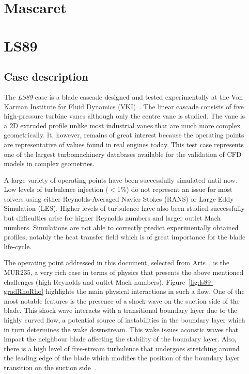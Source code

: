 \chapter{Mascaret}


\chapter{LS89}\label{chap:ls89}

\section{Case description} 
The \textit{LS89} case is a blade cascade designed and tested experimentally at the Von Karman Institute for Fluid Dynamics (VKI)~\cite{arts1990}. The linear cascade consists of five high-pressure turbine vanes although only the centre vane is studied. The vane is a 2D extruded profile unlike most industrial vanes that are much more complex geometrically. It, however, remains of great interest because the operating points are representative of values found in real engines today. This test case represents one of the largest turbomachinery databases available for the validation of CFD models in complex geometries.

A large variety of operating points have been successfully simulated until now. Low levels of turbulence injection ($<1$\%) do not represent an issue for most solvers \cite{Gourdain2010,emory2016} using either Reynolds-Averaged Navier Stokes (RANS) or Large Eddy Simulation (LES). Higher levels of turbulence have also been studied successfully~\cite{Wheeler2015} but difficulties arise for higher Reynolds numbers and larger outlet Mach numbers. Simulations are not able to correctly predict experimentally obtained profiles, notably the heat transfer field which is of great importance for the blade life-cycle.

The operating point addressed in this document, selected from Arts~\cite{arts1990}, is the MUR235, a very rich case in terms of physics that presents the above mentioned challenges (high Reynolds and outlet Mach numbers). Figure~\ref{fig:ls89-gradRhoRho} highlights the main physical interactions in such a flow. One of the most notable features is the presence of a shock wave on the suction side of the blade. This shock wave interacts with a transitional boundary layer due to the highly curved flow, a potential source of instabilities in the boundary layer which in turn determines the wake downstream. This wake issues acoustic waves that impact the neighbour blade affecting the stability of the boundary layer. Also, there is a high level of free-stream turbulence that undergoes stretching around the leading edge of the blade which modifies the position of the boundary layer transition on the suction side~\cite{Segui2017a}.


